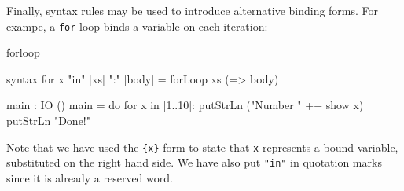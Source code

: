 Finally, syntax rules may be used to introduce alternative binding forms. For
exampe, a \texttt{for} loop binds a variable on each iteration:

\begin{SaveVerbatim}{forloop}

syntax for {x} "in" [xs] ":" [body] = forLoop xs (\x => body)
  
main : IO ()
main = do for x in [1..10]:
              putStrLn ("Number " ++ show x)
          putStrLn "Done!"

\end{SaveVerbatim}

\noindent
Note that we have used the \texttt{\{x\}} form to state that \texttt{x} represents
a bound variable, substituted on the right hand side. We have also put \texttt{"in"} in
quotation marks since it is already a reserved word.



